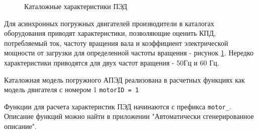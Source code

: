 \begin{figure}[h!]
	\caption{Каталожные характеристики ПЭД}
	\label{ris:novomet_motor_1}
\end{figure}

Для асинхронных погружных двигателей производители в каталогах оборудования приводят характеристики, позволяющие оценить КПД, потребляемый ток, частоту вращения вала и коэффициент электрической мощности от загрузки для определенной частоты вращения - рисунок \ref{ris:novomet_motor_1}. Нередко характеристики приводятся для двух частот вращения - 50Гц и 60 Гц.


Каталожная модель погружного АПЭД реализована в расчетных функциях \unf{} как модель двигателя с номером 1  \texttt{motorID = 1}

Функции для расчета характеристик ПЭД начинаются с префикса \texttt{motor_}. Описание функций можно найти в приложении "Автоматически сгенерированное описание".

\fi

\newpage
